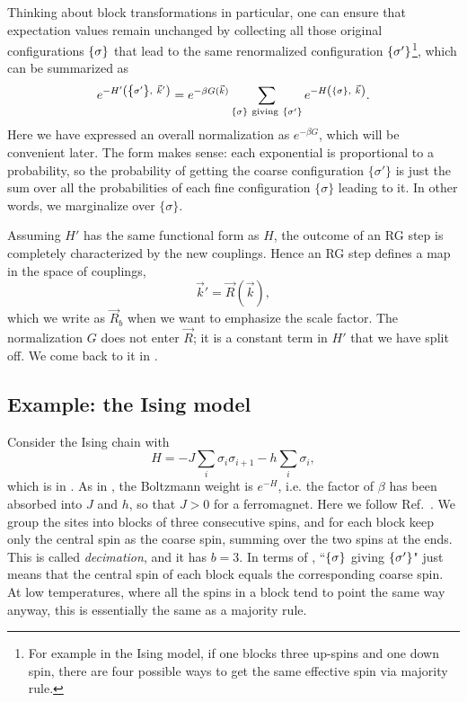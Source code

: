 Thinking about block transformations in particular, one can
ensure that expectation values remain unchanged by collecting
all those original configurations $\left\{\sigma\right\}$ that lead to the same
renormalized configuration $\left\{\sigma'\right\}$\footnote{For example in the 
Ising model, if one blocks three up-spins and one down spin, there are
four possible ways to get the same effective spin via majority rule.}, which can be
summarized as
\begin{equation}\label{eq:RGxformBoltzmann}
  e^{-H'\left(\left\{\sigma'\right\},~\vec{k}'\right)}
     =e^{-\beta G(\vec{k})}\sum_{\left\{\sigma\right\}~
                        {\rm giving}~\left\{\sigma'\right\}}
      e^{-H\left(\left\{\sigma\right\},~\vec{k}\right)}.
\end{equation}
Here we have expressed an overall normalization as $e^{-\beta G}$, which will
be convenient later. The form makes sense: each exponential is proportional to a
probability, so the probability of getting the coarse configuration $\{\sigma'\}$ is
just the sum over all the probabilities of each fine configuration $\{\sigma\}$
leading to it. In other words, we marginalize over $\{\sigma\}$.

Assuming $H'$ has the same functional form as $H$, the outcome of an RG step is
completely characterized by the new couplings. Hence an RG step defines a map
in the space of couplings,
\begin{equation}\label{eq:RGmap}
  \vec{k}'=\vec{R}(\vec{k}),
\end{equation}
which we write as $\vec{R}_b$ when we want to emphasize the scale factor.
The normalization $G$ does not enter $\vec{R}$; it is a constant term in $H'$
that we have split off. We come back to it in .

\subsection{Example: the  Ising model}\label{sec:1dIsingRG}

Consider the  Ising chain with
\begin{equation}
  H=-J\sum_i \sigma_i\sigma_{i+1}-h\sum_i \sigma_i,
\end{equation}
which is  in . As in , the
Boltzmann weight is $e^{-H}$, i.e. the factor of $\beta$ has been absorbed into
$J$ and $h$, so that $J>0$ for a ferromagnet. Here we follow
Ref.~\cite{cardy_scaling_1996}. We group the sites into blocks of three
consecutive spins, and for each block keep only the central spin as the coarse
spin, summing over the two spins at the ends. This is called
{\it decimation}, and it has $b=3$. In terms of
, ``$\left\{\sigma\right\}$ giving $\left\{\sigma'\right\}$" just
means that the central spin of each block equals the corresponding coarse spin.
At low temperatures, where all the spins in a block tend to point the same way
anyway, this is essentially the same as a majority rule.


